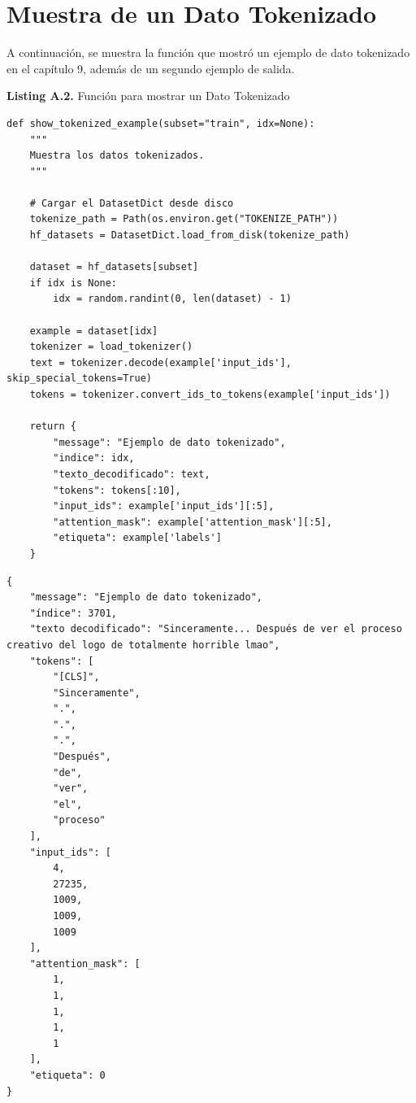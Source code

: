\section{Muestra de un Dato Tokenizado}

A continuación, se muestra la función que mostró un ejemplo de dato tokenizado en el capítulo 9, además de un segundo ejemplo de salida.

\begin{center}
\textbf{Listing A.2.} Función para mostrar un Dato Tokenizado
\end{center}

\begin{lstlisting}[style=pythoncode]
def show_tokenized_example(subset="train", idx=None):
    """
    Muestra los datos tokenizados.
    """

    # Cargar el DatasetDict desde disco
    tokenize_path = Path(os.environ.get("TOKENIZE_PATH"))
    hf_datasets = DatasetDict.load_from_disk(tokenize_path)

    dataset = hf_datasets[subset]
    if idx is None:
        idx = random.randint(0, len(dataset) - 1)

    example = dataset[idx]
    tokenizer = load_tokenizer()
    text = tokenizer.decode(example['input_ids'], skip_special_tokens=True)
    tokens = tokenizer.convert_ids_to_tokens(example['input_ids'])

    return {
        "message": "Ejemplo de dato tokenizado",
        "indice": idx,
        "texto_decodificado": text,
        "tokens": tokens[:10],
        "input_ids": example['input_ids'][:5],
        "attention_mask": example['attention_mask'][:5],
        "etiqueta": example['labels']
    }
\end{lstlisting}


\begin{lstlisting}[style=jsoncode]
{
    "message": "Ejemplo de dato tokenizado",
    "índice": 3701,
    "texto decodificado": "Sinceramente... Después de ver el proceso creativo del logo de totalmente horrible lmao",
    "tokens": [
        "[CLS]",
        "Sinceramente",
        ".",
        ".",
        ".",
        "Después",
        "de",
        "ver",
        "el",
        "proceso"
    ],
    "input_ids": [
        4,
        27235,
        1009,
        1009,
        1009
    ],
    "attention_mask": [
        1,
        1,
        1,
        1,
        1
    ],
    "etiqueta": 0
}
\end{lstlisting}


